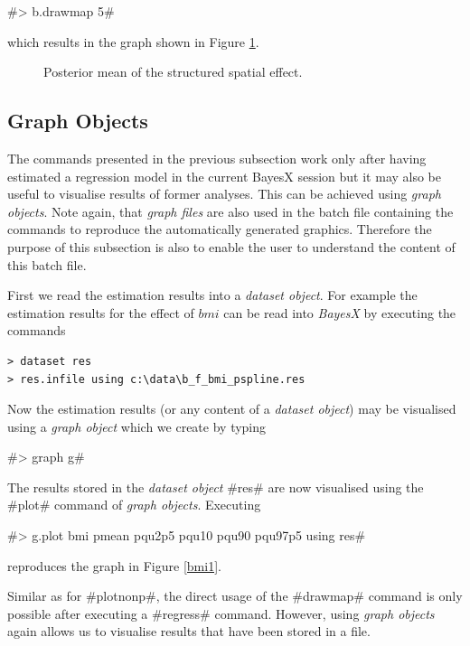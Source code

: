 \documentclass{article}
\begin{document}
#> b.drawmap 5#

which results in the graph shown in Figure \ref{spat1}.

\begin{figure}[ht]
\begin{center}
{\it\caption{Posterior mean of the structured spatial
effect.\label{spat1}}}
\end{center}
\end{figure}

\subsection{Graph Objects}

The commands presented in the previous subsection work only after
having estimated a regression model in the current BayesX session
but it may also be useful to visualise results of former analyses.
This can be achieved using {\em graph objects}. Note again, that
{\em graph files} are also used in the batch file containing the
commands to reproduce the automatically generated graphics.
Therefore the purpose of this subsection is also to enable the
user to understand the content of this batch file.

First we read the estimation results into a {\it dataset object}.
For example the estimation results for the effect of $bmi$ can be
read into {\it BayesX} by executing the commands

\begin{verbatim}
> dataset res
> res.infile using c:\data\b_f_bmi_pspline.res
\end{verbatim}

Now the estimation results (or any content of a {\it dataset
object}) may be visualised using a {\it graph object} which we
create by typing

#> graph g#

The results stored in the {\em dataset object} #res# are now
visualised using the #plot# command of {\it graph objects}.
Executing

#> g.plot bmi pmean pqu2p5 pqu10 pqu90 pqu97p5 using res#

reproduces the graph in Figure \ref{bmi1}.

Similar as for #plotnonp#, the direct usage of the #drawmap#
command is only possible after executing a #regress# command.
However, using {\it graph objects} again allows us to visualise
results that have been stored in a file.
\end{document}
